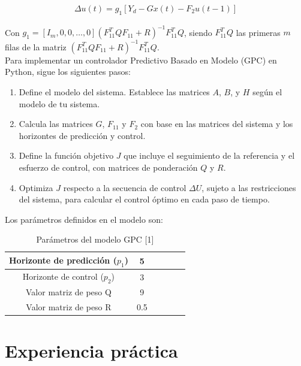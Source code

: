 \documentclass[journal]{IEEEtran}
\begin{document}
\begin{align}
\Delta u(t) = g_1 [Y_d - Gx(t) - F_2u(t - 1)]
\end{align}

Con \( g_1 = \left[ I_m, 0, 0, \ldots, 0 \right] \left( F_{11}^T Q F_{11} + R \right)^{-1} F_{11}^T Q \), siendo \( F_{11}^T Q \) las primeras \( m \) filas de la matriz \( \left( F_{11}^T Q F_{11} + R \right)^{-1} F_{11}^T Q \). \\

Para implementar un controlador Predictivo Basado en Modelo (GPC) en Python, sigue los siguientes pasos:

\begin{enumerate}
    \item Define el modelo del sistema. Establece las matrices \( A \), \( B \), y \( H \) según el modelo de tu sistema.
    \item Calcula las matrices \( G \), \( F_{11} \) y \( F_2 \) con base en las matrices del sistema y los horizontes de predicción y control.
    \item Define la función objetivo \( J \) que incluye el seguimiento de la referencia y el esfuerzo de control, con matrices de ponderación \( Q \) y \( R \).
    \item Optimiza \( J \) respecto a la secuencia de control \( \Delta U \), sujeto a las restricciones del sistema, para calcular el control óptimo en cada paso de tiempo.
\end{enumerate}

Los parámetros definidos en el modelo son:

\begin{table} [htbp]
    \centering
    \caption{Parámetros del modelo GPC [1]}
    \begin{tabular}{|c|c|c|c|c|c|}
        \hline
        Horizonte de predicción ($p_1$) & 5  \\
        \hline
        Horizonte de control ($p_2$) & 3  \\
        \hline
        Valor matriz de peso Q & 9  \\
        \hline
        Valor matriz de peso R & 0.5 \\
        \hline
       
    \end{tabular}
\end{table}


\section{Experiencia práctica}
\end{document}
